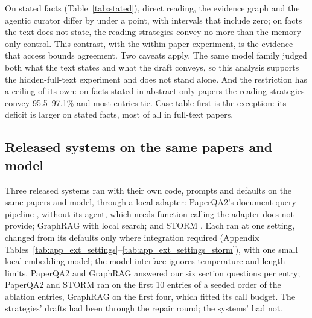 \documentclass{article} %
\begin{document}
On stated facts (Table~\ref{tab:stated}), direct reading, the evidence graph and the agentic curator differ by under a point, with intervals that include zero; on facts the text does not state, the reading strategies convey no more than the memory-only control. This contrast, with the within-paper experiment, is the evidence that access bounds agreement. Two caveats apply. The same model family judged both what the text states and what the draft conveys, so this analysis supports the hidden-full-text experiment and does not stand alone. And the restriction has a ceiling of its own: on facts stated in abstract-only papers the reading strategies convey 95.5--97.1\% and most entries tie. Case table first is the exception: its deficit is larger on stated facts, most of all in full-text papers.

\subsection{Released systems on the same papers and model}
\label{sec:released}
Three released systems ran with their own code, prompts and defaults on the same papers and model, through a local adapter: PaperQA2's document-query pipeline \citep{skarlinski2024language}, without its agent, which needs function calling the adapter does not provide; GraphRAG \citep{edge2024local} with local search; and STORM \citep{shao2024assisting}. Each ran at one setting, changed from its defaults only where integration required (Appendix Tables~\ref{tab:app_ext_settings}--\ref{tab:app_ext_settings_storm}), with one small local embedding model; the model interface ignores temperature and length limits. PaperQA2 and GraphRAG answered our six section questions per entry; PaperQA2 and STORM ran on the first 10 entries of a seeded order of the ablation entries, GraphRAG on the first four, which fitted its call budget. The strategies' drafts had been through the repair round; the systems' had not.
\end{document}
